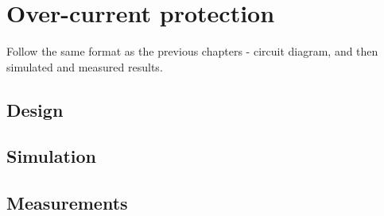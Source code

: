 \chapter{Over-current protection}

Follow the same format as the previous chapters - circuit diagram, and then simulated and measured results. 

\section{Design} \label{sec:sw_design}


\section{Simulation} \label{sec:sw_simu}

\section{Measurements} \label{sec:sw_meas}








